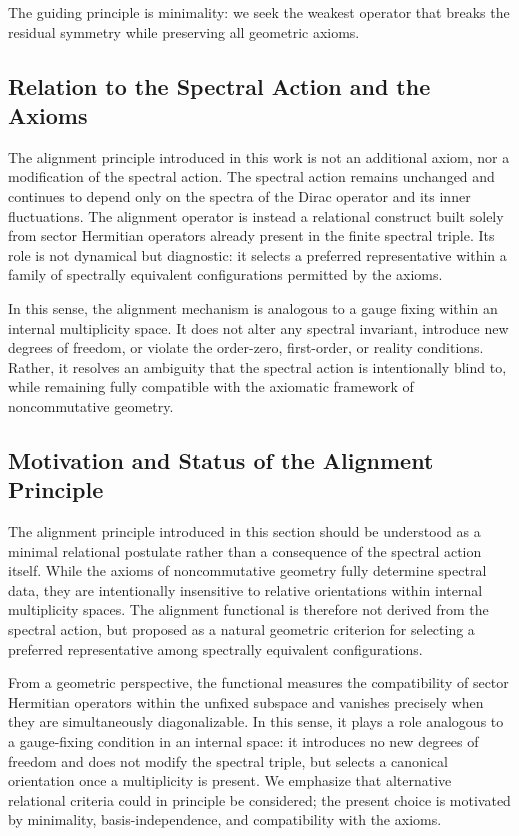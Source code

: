 The guiding principle is minimality: we seek the weakest operator that breaks the residual symmetry while preserving all geometric axioms.

\subsection{Relation to the Spectral Action and the Axioms}

The alignment principle introduced in this work is not an additional axiom, nor a modification of the spectral action. The spectral action remains unchanged and continues to depend only on the spectra of the Dirac operator and its inner fluctuations. The alignment operator is instead a relational construct built solely from sector Hermitian operators already present in the finite spectral triple. Its role is not dynamical but diagnostic: it selects a preferred representative within a family of spectrally equivalent configurations permitted by the axioms.

In this sense, the alignment mechanism is analogous to a gauge fixing within an internal multiplicity space. It does not alter any spectral invariant, introduce new degrees of freedom, or violate the order-zero, first-order, or reality conditions. Rather, it resolves an ambiguity that the spectral action is intentionally blind to, while remaining fully compatible with the axiomatic framework of noncommutative geometry.

\subsection{Motivation and Status of the Alignment Principle}

The alignment principle introduced in this section should be understood as a minimal relational postulate rather than a consequence of the spectral action itself. While the axioms of noncommutative geometry fully determine spectral data, they are intentionally insensitive to relative orientations within internal multiplicity spaces. The alignment functional is therefore not derived from the spectral action, but proposed as a natural geometric criterion for selecting a preferred representative among spectrally equivalent configurations.

From a geometric perspective, the functional measures the compatibility of sector Hermitian operators within the unfixed subspace and vanishes precisely when they are simultaneously diagonalizable. In this sense, it plays a role analogous to a gauge-fixing condition in an internal space: it introduces no new degrees of freedom and does not modify the spectral triple, but selects a canonical orientation once a multiplicity is present. We emphasize that alternative relational criteria could in principle be considered; the present choice is motivated by minimality, basis-independence, and compatibility with the axioms.


